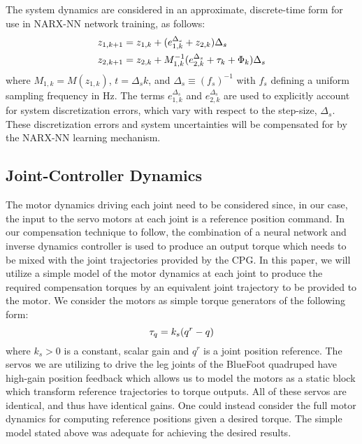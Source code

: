 The system dynamics are considered in an approximate, discrete-time form for use in NARX-NN network 
training, as follows:
	\begin{equation}
		\vspace{-1.0mm}
		\begin{split}
		{z}_{1,k+1} &= {z}_{1,k} + ( {e}_{1,k}^{\Delta_{s}} + {z}_{2,k} )\Delta_{s} \\
		{z}_{2,k+1} &= {z}_{2,k} + M^{-1}_{1,k}( {e}_{2,k}^{\Delta_{s}} + \tau_{k} + \Phi_{k}) \Delta_{s} \\
		\end{split}
		\label{eq::sampled_dynamics}
	\end{equation}
where $M_{1,k} = M(z_{1,k})$, $t = \Delta_{s} k$, and $\Delta_{s} \equiv (f_{s})^{-1}$ with $f_{s}$ defining a uniform 
sampling frequency in Hz. The terms ${e}_{1,k}^{\Delta_{s}}$ and ${e}_{2,k}^{\Delta_{s}}$ are used to explicitly 
account for system discretization errors, which vary with respect to the step-size, $\Delta_{s}$. These
discretization errors and system uncertainties will be compensated for by the NARX-NN learning mechanism.


\subsection{Joint-Controller Dynamics}
%
%
The motor dynamics driving each joint need to be considered since, in our case, the input to the
servo motors at each joint is a reference position command. In our compensation technique to follow,
the combination of a neural network and inverse dynamics controller is used to produce an output
torque which needs to be mixed  with the joint trajectories provided by the CPG. In this paper,
we will utilize a simple model of the motor dynamics at each joint to produce the required compensation
torques by an equivalent joint trajectory to be provided to the motor. We consider the motors as simple
torque generators of the following form:
	\begin{equation}
		\vspace{-1mm}
		\tau_{q} = k_{s}(q^{r}-q)
		\label{eq::servo_control_dynamics}
	\end{equation}
where $k_{s}>0$ is a constant, scalar gain and $q^{r}$ is a joint position reference. The servos we are utilizing to drive the leg joints of
the BlueFoot quadruped have high-gain position feedback which allows us to model the motors as a static block which transform reference trajectories to torque outputs. All of these servos are identical, and thus have identical gains. One could instead consider the full motor dynamics for computing reference positions given a desired torque. The simple model stated above was
adequate for achieving the desired results.